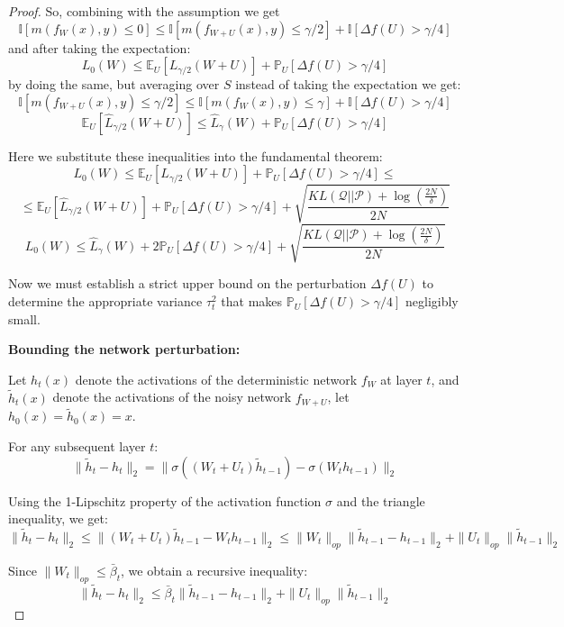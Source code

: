 \documentclass[a4paper,14pt]{extarticle}
\begin{document}
\begin{proof}
        So, combining with the assumption we get 
        $$\mathbb{I}[m(f_W(x), y)\leqslant 0] \leqslant \mathbb{I}[m(f_{W+U}(x), y)\leqslant \gamma/2] + \mathbb{I}[\Delta f(U) > \gamma / 4]$$
        and after taking the expectation:
        $$L_0(W)\leqslant \mathbb{E}_U[L_{\gamma / 2}(W + U)] + \mathbb{P}_U[\Delta f(U) > \gamma / 4]$$
        by doing the same, but averaging over $S$ instead of taking the expectation we get:
        $$\mathbb{I}[m(f_{W+U}(x), y)\leqslant \gamma / 2] \leqslant \mathbb{I}[m(f_{W}(x), y)\leqslant \gamma] + \mathbb{I}[\Delta f(U) > \gamma / 4]$$
        $$\mathbb{E}_U[\widehat{L}_{\gamma / 2}(W + U)] \leqslant \widehat{L}_\gamma(W) + \mathbb{P}_U[\Delta f(U) > \gamma / 4]$$

        Here we substitute these inequalities into the fundamental theorem:
        $$L_0(W)\leqslant \mathbb{E}_U[L_{\gamma / 2}(W + U)] + \mathbb{P}_U[\Delta f(U) > \gamma / 4]\leqslant $$
        $$\leqslant\mathbb{E}_U[\widehat{L}_{\gamma / 2}(W + U)] + \mathbb{P}_U[\Delta f(U) > \gamma / 4] + \sqrt{\frac{KL(\mathcal{Q} || \mathcal{P}) + \log\left(\frac{2N}{\delta}\right)}{2N}}  $$
        $$L_0(W)\leqslant \widehat{L}_\gamma(W) + 2\mathbb{P}_U[\Delta f(U) > \gamma / 4] + \sqrt{\frac{KL(\mathcal{Q} || \mathcal{P}) + \log\left(\frac{2N}{\delta}\right)}{2N}}$$


        Now we must establish a strict upper bound on the perturbation $\Delta f(U)$ to determine the appropriate variance $\tau_t^2$ that makes $\mathbb{P}_U[\Delta f(U) > \gamma / 4]$ negligibly small.                

        \textbf{Bounding the network perturbation:}

        Let $h_t(x)$ denote the activations of the deterministic network $f_W$ at layer $t$, and $\tilde{h}_t(x)$ denote the activations of the noisy network $f_{W+U}$, let $h_0(x) = \tilde{h}_0(x) = x$. 
        
        For any subsequent layer $t$:
        $$ \|\tilde{h}_t - h_t\|_2 = \|\sigma((W_t + U_t)\tilde{h}_{t-1}) - \sigma(W_t h_{t-1})\|_2 $$

        Using the 1-Lipschitz property of the activation function $\sigma$ and the triangle inequality, we get:
        $$ \|\tilde{h}_t - h_t\|_2 \leqslant \|(W_t + U_t)\tilde{h}_{t-1} - W_t h_{t-1}\|_2 \leqslant \|W_t\|_{op} \|\tilde{h}_{t-1} - h_{t-1}\|_2 + \|U_t\|_{op} \|\tilde{h}_{t-1}\|_2 $$

        Since $\|W_t\|_{op} \leqslant \bar{\beta}_t$, we obtain a recursive inequality:
        $$ \|\tilde{h}_t - h_t\|_2 \leqslant \bar{\beta}_t \|\tilde{h}_{t-1} - h_{t-1}\|_2 + \|U_t\|_{op} \|\tilde{h}_{t-1}\|_2 $$


\end{proof}
\end{document}
